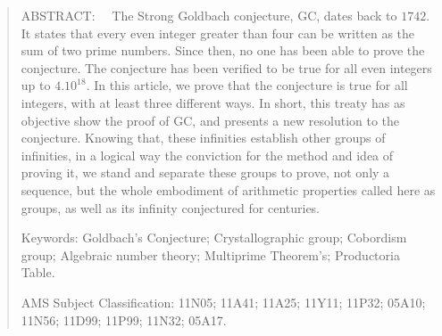 \documentclass[12pt]{article}
\begin{document}
\begin{quote}
\item ABSTRACT:
\ \
The Strong Goldbach conjecture, GC, dates back to $1742 $. It states that every even integer greater than four can be written as the sum of two prime numbers. Since then, no one has been able to prove the conjecture. The conjecture has been verified to be true for all even integers up to $4.10^{18} $. In this article, we prove that the conjecture is true for all integers, with at least three different ways.
In short, this treaty has as objective show the proof of GC, and presents a new resolution to the conjecture. Knowing that, these infinities establish other groups of infinities, in a  logical way the conviction for the method and idea of proving it, we stand and separate these groups to prove, not only a sequence, but the whole embodiment of arithmetic properties called here as groups, as well as its infinity conjectured for centuries.
\\

\item Keywords:
Goldbach's Conjecture; Crystallographic group; Cobordism group; Algebraic number theory; Multiprime Theorem's;  Productoria Table.
\\

\item AMS Subject Classification:
11N05; 11A41; 11A25; 11Y11; 11P32; 05A10; 11N56; 11D99; 11P99; 11N32; 05A17.
\end{quote}
\end{document}

